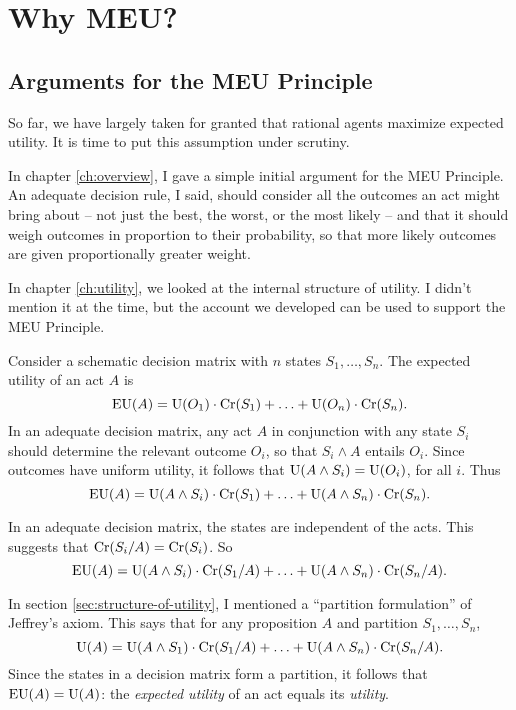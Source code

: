 \chapter{Why MEU?}\label{ch:risk}

\section{Arguments for the MEU Principle}\label{sec:why-meu}

So far, we have largely taken for granted that rational agents maximize expected
utility. It is time to put this assumption under scrutiny.

In chapter \ref{ch:overview}, I gave a simple initial argument for the MEU
Principle. An adequate decision rule, I said, should consider all the outcomes
an act might bring about -- not just the best, the worst, or the most likely --
and that it should weigh outcomes in proportion to their probability, so that
more likely outcomes are given proportionally greater weight.

In chapter \ref{ch:utility}, we looked at the internal structure of utility. I
didn't mention it at the time, but the account we developed can be used to
support the MEU Principle.

Consider a schematic decision matrix with $n$ states $S_{1},\ldots,S_{n}$. The
expected utility of an act $A$ is
\[
  \text{EU}(A) = \text{U}(O_{1})\cdot \text{Cr}(S_{1}) + \ldots + \text{U}(O_{n})\cdot \text{Cr}(S_{n}).
\]
In an adequate decision matrix, any act $A$ in conjunction with any state
$S_{i}$ should determine the relevant outcome $O_{i}$, so that $S_{i} \land A$
entails $O_{i}$. Since outcomes have uniform utility, it follows that
$\text{U}(A \land S_{i}) = \text{U}(O_{i})$, for all $i$. Thus
\[
  \text{EU}(A) = \text{U}(A \land S_{i})\cdot \text{Cr}(S_{1}) + \ldots + \text{U}(A \land S_{n})\cdot \text{Cr}(S_{n}).
\]

In an adequate decision matrix, the states are independent of the acts. This suggests that $\text{Cr}(S_{i} / A) = \text{Cr}(S_{i})$. So
\[
  \text{EU}(A) = \text{U}(A \land S_{i})\cdot \text{Cr}(S_{1}/A) + \ldots + \text{U}(A \land S_{n})\cdot \text{Cr}(S_{n}/A).
\]

In section \ref{sec:structure-of-utility}, I mentioned a ``partition
formulation'' of Jeffrey's axiom. This says that for any proposition $A$ and
partition $S_{1},\ldots,S_{n}$,
\[
  \text{U}(A) = \text{U}(A \land S_{1})\cdot \text{Cr}(S_{1}/A) + \ldots + \text{U}(A \land S_{n})\cdot \text{Cr}(S_{n}/A).
\]
Since the states in a decision matrix form a partition, it follows that
$\text{EU}(A) = \text{U}(A)$: the \emph{expected utility} of an act equals its
\emph{utility}.

